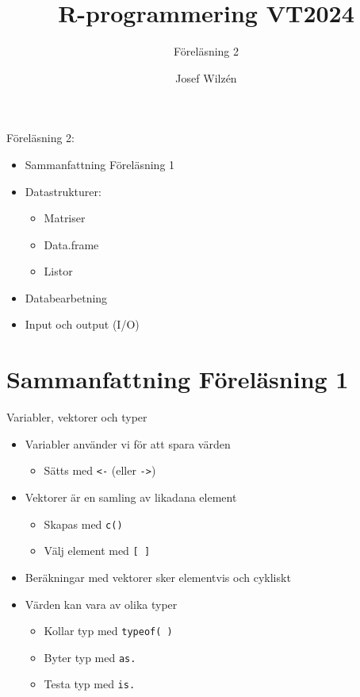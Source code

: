 \documentclass[
  11pt,
  ignorenonframetext,
]{beamer}
\title{R-programmering VT2024}
\subtitle{Föreläsning 2}
\author{Josef Wilzén}
\date{}
\institute{Linköpings Universitet}
\providecommand{\tightlist}{%
  \setlength{\itemsep}{0pt}\setlength{\parskip}{0pt}}
\begin{document}
\frame{\titlepage}

\begin{frame}{Föreläsning 2:}
\label{fuxf6reluxe4sning-2}
\begin{itemize}
\tightlist
\item
  Sammanfattning Föreläsning 1
\item
  Datastrukturer:

  \begin{itemize}
  \tightlist
  \item
    Matriser
  \item
    Data.frame
  \item
    Listor
  \end{itemize}
\item
  Databearbetning
\item
  Input och output (I/O)
\end{itemize}
\end{frame}

\section{Sammanfattning Föreläsning
1}\label{sammanfattning-fuxf6reluxe4sning-1}

\begin{frame}{Variabler, vektorer och typer}
\label{variabler-vektorer-och-typer}
\begin{itemize}
\tightlist
\item
  Variabler använder vi för att spara värden

  \begin{itemize}
  \tightlist
  \item
    Sätts med \texttt{<-} (eller \texttt{->})
  \end{itemize}
\item
  Vektorer är en samling av likadana element

  \begin{itemize}
  \tightlist
  \item
    Skapas med \texttt{c()}
  \item
    Välj element med \texttt{[ ]}
  \end{itemize}
\item
  Beräkningar med vektorer sker elementvis och cykliskt
\item
  Värden kan vara av olika typer

  \begin{itemize}
  \tightlist
  \item
    Kollar typ med \texttt{typeof( )}
  \item
    Byter typ med \texttt{as.}
  \item
    Testa typ med \texttt{is.}
  \end{itemize}
\end{itemize}
\end{frame}
\end{document}
